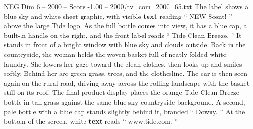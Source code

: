 \begin{textsample}{NEG Dim 6 – 2000 – Score -1.00 – 2000/tv\_com\_2000\_65.txt}
The label shows a blue sky and white sheet graphic, with visible \textbf{text} reading “ NEW Scent! ” above the large Tide logo.
As the full bottle comes into view, it has a blue cap, a built-in handle on the right, and the front label reads “ Tide Clean Breeze. ” It stands in front of a bright window with blue sky and clouds outside.
Back in the countryside, the woman holds the woven basket full of neatly folded white laundry.
She lowers her gaze toward the clean clothes, then looks up and smiles softly.
Behind her are green grass, trees, and the clothesline.
The car is then seen again on the rural road, driving away across the rolling landscape with the basket still on its roof.
The final product display places the orange Tide Clean Breeze bottle in tall grass against the same blue-sky countryside background.
A second, pale bottle with a blue cap stands slightly behind it, branded “ Downy. ” At the bottom of the screen, white \textbf{text} reads “ www.tide.com. ”

\end{textsample}

